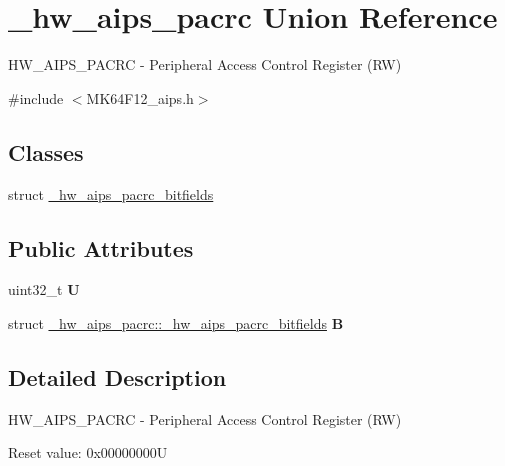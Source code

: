 \hypertarget{union__hw__aips__pacrc}{}\section{\+\_\+hw\+\_\+aips\+\_\+pacrc Union Reference}
\label{union__hw__aips__pacrc}


H\+W\+\_\+\+A\+I\+P\+S\+\_\+\+P\+A\+C\+RC -\/ Peripheral Access Control Register (RW)  




{\ttfamily \#include $<$M\+K64\+F12\+\_\+aips.\+h$>$}

\subsection*{Classes}
\begin{DoxyCompactItemize}
\item 
struct \hyperlink{struct__hw__aips__pacrc_1_1__hw__aips__pacrc__bitfields}{\+\_\+hw\+\_\+aips\+\_\+pacrc\+\_\+bitfields}
\end{DoxyCompactItemize}
\subsection*{Public Attributes}
\begin{DoxyCompactItemize}
\item 
uint32\+\_\+t {\bfseries U}\hypertarget{union__hw__aips__pacrc_a6152eff59143b9f1fe636ab506d9ce19}{}\label{union__hw__aips__pacrc_a6152eff59143b9f1fe636ab506d9ce19}

\item 
struct \hyperlink{struct__hw__aips__pacrc_1_1__hw__aips__pacrc__bitfields}{\+\_\+hw\+\_\+aips\+\_\+pacrc\+::\+\_\+hw\+\_\+aips\+\_\+pacrc\+\_\+bitfields} {\bfseries B}\hypertarget{union__hw__aips__pacrc_a79970936d795677b3e8c0a6693f79279}{}\label{union__hw__aips__pacrc_a79970936d795677b3e8c0a6693f79279}

\end{DoxyCompactItemize}


\subsection{Detailed Description}
H\+W\+\_\+\+A\+I\+P\+S\+\_\+\+P\+A\+C\+RC -\/ Peripheral Access Control Register (RW) 

Reset value\+: 0x00000000U

